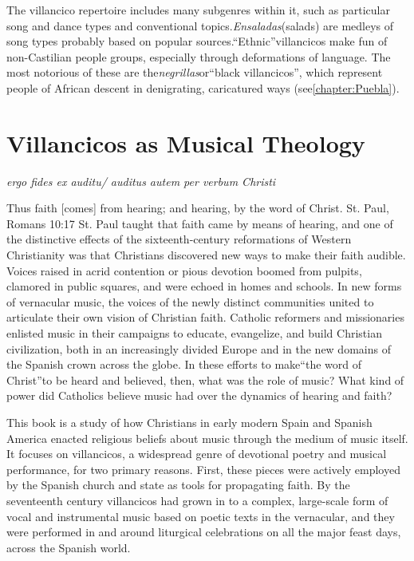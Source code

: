 \documentclass{memoir}
\begin{document}
The villancico repertoire includes many subgenres within it, such as particular song and dance types and conventional topics.\emph{Ensaladas}(salads) are medleys of song types probably based on popular sources.\enquote{Ethnic}villancicos make fun of non-Castilian people groups, especially through deformations of language. The most notorious of these are the\emph{negrillas}or\enquote{black villancicos}, which represent people of African descent in denigrating, caricatured ways (see\ref{chapter:Puebla}).

\mainmatter

\chapter{Villancicos as Musical Theology}
\label{chapter:intro}

\emph{ergo fides ex auditu/ auditus autem per verbum Christi}

Thus faith [comes] from hearing; and hearing, by the word of Christ.
St. Paul, Romans 10:17
St. Paul taught that faith came by means of hearing, and one of the distinctive effects of the sixteenth-century reformations of Western Christianity was that Christians discovered new ways to make their faith audible. Voices raised in acrid contention or pious devotion boomed from pulpits, clamored in public squares, and were echoed in homes and schools. In new forms of vernacular music, the voices of the newly distinct communities united to articulate their own vision of Christian faith. Catholic reformers and missionaries enlisted music in their campaigns to educate, evangelize, and build Christian civilization, both in an increasingly divided Europe and in the new domains of the Spanish crown across the globe. In these efforts to make\enquote{the word of Christ}to be heard and believed, then, what was the role of music? What kind of power did Catholics believe music had over the dynamics of hearing and faith?

This book is a study of how Christians in early modern Spain and Spanish America enacted religious beliefs about music through the medium of music itself. It focuses on villancicos, a widespread genre of devotional poetry and musical performance, for two primary reasons. First, these pieces were actively employed by the Spanish church and state as tools for propagating faith. By the seventeenth century villancicos had grown in to a complex, large-scale form of vocal and instrumental music based on poetic texts in the vernacular, and they were performed in and around liturgical celebrations on all the major feast days, across the Spanish world.
\end{document}
